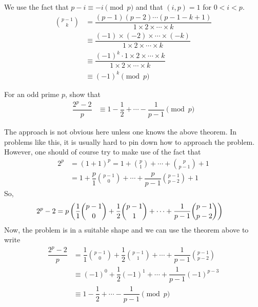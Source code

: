 	\begin{solution}
		We use the fact that $p-i\equiv-i\pmod p$ and that $(i,p)=1$ for $0<i<p$.
			\begin{align*}
				\binom{p-1}{k}
					& = \dfrac{(p-1)(p-2)\cdots(p-1-k+1)}{1\times 2 \times \cdots \times k}\\
					& \equiv \dfrac{(-1) \times (-2) \times \cdots \times (-k)}{1\times 2 \times \cdots \times k}\\
					& \equiv\dfrac{(-1)^k \cdot 1\times 2 \times \cdots \times k}{1\times 2 \times \cdots \times k}\\
					& \equiv(-1)^k\pmod p
			\end{align*}

	\end{solution}

	\begin{problem}
		For an odd prime $p$, show that
			\begin{align*}
				\dfrac{2^p-2}{p} & \equiv1-\dfrac{1}{2}+\cdots-\dfrac{1}{p-1}\pmod p
			\end{align*}
	\end{problem}

	\begin{solution}
		The approach is not obvious here unless one knows the above theorem. In problems like this, it is usually hard to pin down how to approach the problem. However, one should of course try to make use of the fact that
			\begin{align*}
				2^p
					& = (1+1)^p = 1+\binom{p}{1}+\cdots+\binom{p}{p-1}+1\\
					& = 1+\dfrac{p}{1}\binom{p-1}{0}+\cdots+\dfrac{p}{p-1}\binom{p-1}{p-2}+1
			\end{align*}
		So,
			\begin{align*}
				2^p-2
					& = p\left(\frac{1}{1}\binom{p-1}{0}+\dfrac{1}{2}\binom{p-1}{1}+\cdots+\dfrac{1}{p-1}\binom{p-1}{p-2}\right)
			\end{align*}
		Now, the problem is in a suitable shape and we can use the theorem above to write
			\begin{align*}
				\dfrac{2^p-2}{p}
					& = \dfrac{1}{1}\binom{p-1}{0}+\dfrac{1}{2}\binom{p-1}{1}+\cdots+\dfrac{1}{p-1}\binom{p-1}{p-2}\\
					& \equiv(-1)^0+\dfrac{1}{2}(-1)^1+\cdots+\dfrac{1}{p-1}(-1)^{p-3}\\
					& \equiv1-\dfrac{1}{2}+\cdots-\dfrac{1}{p-1}\pmod p
			\end{align*}

	\end{solution}

